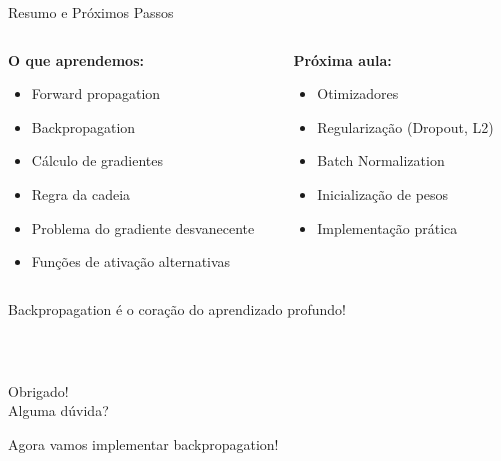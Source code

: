\documentclass[xcolor=dvipsnames,t,aspectratio=169]{beamer}
\newcommand{\highlight}[1]{{\color{nes_dark_orange} #1}}
\begin{document}
\begin{frame}[c]{Resumo e Próximos Passos}
    \begin{columns}[c]
        \begin{column}{0.5\textwidth}
            \textbf{O que aprendemos:}
            \begin{itemize}
                \item Forward propagation
                \item \highlight{Backpropagation}
                \item Cálculo de gradientes
                \item Regra da cadeia
                \item Problema do gradiente desvanecente
                \item Funções de ativação alternativas
            \end{itemize}
        \end{column}
        \begin{column}{0.5\textwidth}
            \textbf{Próxima aula:}
            \begin{itemize}
                \item Otimizadores
                \item Regularização (Dropout, L2)
                \item Batch Normalization
                \item Inicialização de pesos
                \item Implementação prática
            \end{itemize}
        \end{column}
    \end{columns}
    
    \vspace{0.5cm}
    
    \begin{center}
        \Large
        \highlight{Backpropagation é o coração do aprendizado profundo!}
    \end{center}
\end{frame}

\begin{frame}
    \frametitle{~}
    \vfill
    \begin{center}
        {\Huge Obrigado!}\vspace{1.5em}\\
        {\Large \highlight{Alguma dúvida?}}\\
    \end{center}
    \vfill
    \begin{center}
        {\small Agora vamos implementar backpropagation!}
    \end{center}
\end{frame}
\end{document}
